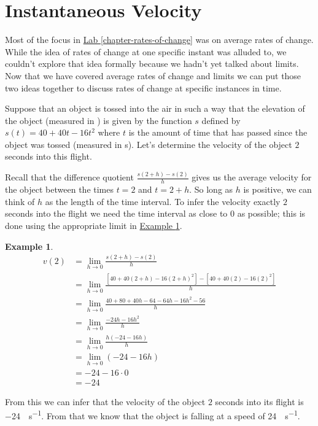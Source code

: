 \documentclass[12pt,]{book}
\theoremstyle{plain}
\theoremstyle{definition}
\newtheorem{example}[theorem]{Example}
\numberwithin{equation}{section}
\newcommand{\fe}[2]{#1\mathopen{}\left(#2\right)\mathclose{}}
\begin{document}
\section[Instantaneous Velocity]{Instantaneous Velocity}\label{section-instantaneous-velocity}
Most of the focus in \hyperref[chapter-rates-of-change]{Lab \ref{chapter-rates-of-change}} was on average rates of change. While the idea of rates of change at one specific instant was alluded to, we couldn't explore that idea formally because we hadn't yet talked about limits. Now that we have covered average rates of change and limits we can put those two ideas together to discuss rates of change at specific instances in time.%
\par
Suppose that an object is tossed into the air in such a way that the elevation of the object (measured in \si{\foot}) is given by the function \(s\) defined by \(\fe{s}{t}=40+40t-16t^2\) where \(t\) is the amount of time that has passed since the object was tossed (measured in \si{\second}). Let's determine the velocity of the object \(2\) seconds into this flight.%
\par
Recall that the difference quotient \(\frac{\fe{s}{2+h}-\fe{s}{2}}{h}\) gives us the average velocity for the object between the times \(t=2\) and \(t=2+h\). So long as \(h\) is positive, we can think of \(h\) as the length of the time interval. To infer the velocity exactly \(2\) seconds into the flight we need the time interval as close to \(0\) as possible; this is done using the appropriate limit in \hyperref[example-instantaneous-velocity]{Example \ref{example-instantaneous-velocity}}.%
\begin{example}\label{example-instantaneous-velocity}
\begin{align*}
\fe{v}{2}&=\lim_{h\to0}\frac{\fe{s}{2+h}-\fe{s}{2}}{h}\\
&=\lim_{h\to0}\frac{\left[40+40\left(2+h\right)-16\left(2+h\right)^2\right]-\left[40+40(2)-16(2)^2\right]}{h}\\
&=\lim_{h\to0}\frac{40+80+40h-64-64h-16h^2-56}{h}\\
&=\lim_{h\to0}\frac{-24h-16h^2}{h}\\
&=\lim_{h\to0}\frac{h\left(-24-16h\right)}{h}\\
&=\lim_{h\to0}\left(-24-16h\right)\\
&=-24-16\cdot0\\
&=-24
\end{align*}%
\par
From this we can infer that the velocity of the object \(2\) seconds into its flight is \SI{-24}{\foot\per\second}. From that we know that the object is falling at a speed of \SI{24}{\foot\per\second}.%
\end{example}
\typeout{************************************************}
\typeout{************************************************}
\end{document}

